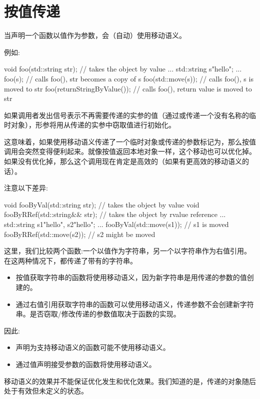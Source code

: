 \section{按值传递}
当声明一个函数以值作为参数，会（自动）使用移动语义。

例如:

\begin{cppcode}
void foo(std::string str); // takes the object by value
...
std::string s{"hello"};
...
foo(s); // calls foo(), str becomes a copy of s
foo(std::move(s)); // calls foo(), s is moved to str
foo(returnStringByValue()); // calls foo(), return value is moved to str
\end{cppcode}

如果调用者发出信号表示不再需要传递的实参的值（通过或传递一个没有名称的临时对象），形参将用从传递的实参中窃取值进行初始化。

这意味着，如果使用移动语义传递了一个临时对象或传递的参数标记为，那么按值调用会突然变得便利起来。就像按值返回本地对象一样，这个移动也可以优化掉。如果没有优化掉，那么这个调用现在肯定是高效的（如果有更高效的移动语义的话）。

注意以下差异:

\begin{cppcode}
void fooByVal(std::string str); // takes the object by value
void fooByRRef(std::string&& str); // takes the object by rvalue reference
...
std::string s1{"hello"}, s2{"hello"};
...
fooByVal(std::move(s1)); // s1 is moved
fooByRRef(std::move(s2)); // s2 might be moved
\end{cppcode}

这里，我们比较两个函数:一个以值作为字符串，另一个以字符串作为右值引用。在这两种情况下，都传递了带有的字符串。

\begin{itemize}
	\item 按值获取字符串的函数将使用移动语义，因为新字符串是用传递的参数的值创建的。
	\item 通过右值引用获取字符串的函数可以使用移动语义，传递参数不会创建新字符串。是否窃取/修改传递的参数值取决于函数的实现。
\end{itemize}

因此:

\begin{itemize}
	\item 声明为支持移动语义的函数可能不使用移动语义。
	\item 通过值声明接受参数的函数将使用移动语义。
\end{itemize}

移动语义的效果并不能保证优化发生和优化效果。我们知道的是，传递的对象随后处于有效但未定义的状态。













